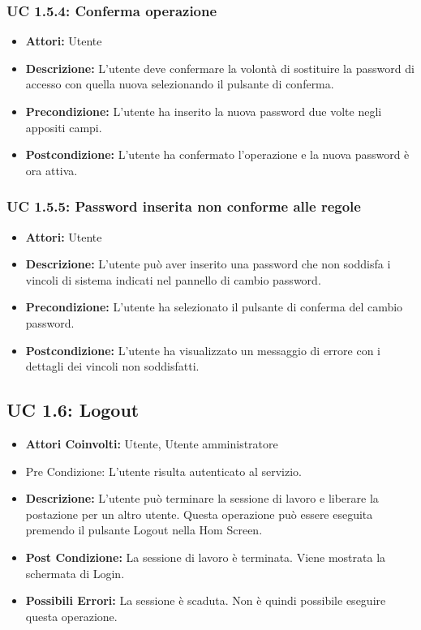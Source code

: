 \subsubsection{UC 1.5.4: Conferma operazione}

\begin{itemize}
\item \textbf{Attori:} Utente
\item \textbf{Descrizione:} L'utente deve confermare la volontà di sostituire la password di accesso con quella nuova selezionando il pulsante di conferma.
\item \textbf{Precondizione:} L'utente ha inserito la nuova password due volte negli appositi campi.
\item \textbf{Postcondizione:} L'utente ha confermato l'operazione e la nuova password è ora attiva.
\end{itemize}

\subsubsection{UC 1.5.5: Password inserita non conforme alle regole}

\begin{itemize}
\item \textbf{Attori:} Utente
\item \textbf{Descrizione:} L'utente può aver inserito una password che non soddisfa i vincoli di sistema indicati nel pannello di cambio password.
\item \textbf{Precondizione:} L'utente ha selezionato il pulsante di conferma del cambio password.
\item \textbf{Postcondizione:} L'utente ha visualizzato un messaggio di errore con i dettagli dei vincoli non soddisfatti.
\end{itemize}

\subsection{UC 1.6: Logout}

\begin{itemize}
\item \textbf{Attori Coinvolti:} Utente, Utente amministratore
\item {Pre Condizione:} L'utente risulta autenticato al servizio.
\item \textbf{Descrizione:} L'utente può terminare la sessione di lavoro e liberare la postazione per un altro utente. Questa operazione può essere eseguita premendo il pulsante Logout nella Hom Screen.
\item \textbf{Post Condizione:} La sessione di lavoro è terminata. Viene mostrata la schermata di Login.
\item \textbf{Possibili Errori:} La sessione è scaduta. Non è quindi possibile eseguire questa operazione.
\end{itemize}

